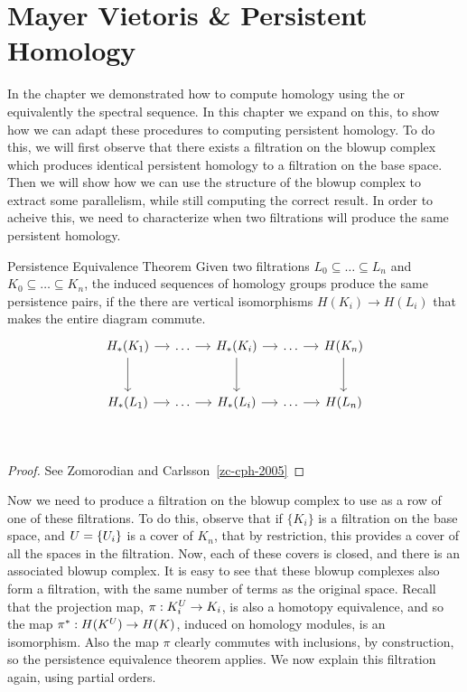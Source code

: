 \chapter{Mayer Vietoris \& Persistent Homology}
In the chapter we demonstrated how to compute homology using the \mvb{} or equivalently the \mv spectral sequence. In this chapter we expand on this, to show how we can adapt these procedures to computing persistent homology. To do this, we will first observe that there exists a filtration on the blowup complex which produces identical persistent homology to a filtration on the base space. Then we will show how we can use the structure of the blowup complex to extract some parallelism, while still computing the correct result. In order to acheive this, we need to characterize when two filtrations will produce the same persistent homology. 
\begin{theorem}{Persistence Equivalence Theorem}
    Given two filtrations $L_0 \subseteq \ldots \subseteq L_n$ and
    $K_0 \subseteq \ldots \subseteq K_n$, the induced sequences of homology
    groups produce the same persistence pairs,
    if the there are vertical isomorphisms $H(K_i) \to H(L_i)$ that makes the entire diagram commute.
\[
\begin{tikzcd}[row sep=large, column sep=small]
    H_*(K_1) \arrow{r}\arrow{d} & \ldots \arrow{r} & H_*(K_i)  \arrow{r}\arrow{d} & \ldots \arrow{r} & H(K_n) \arrow{d} \\
    H_*(L_1) \arrow{r} & \ldots \arrow{r} & H_*(L_i)  \arrow{r} & \ldots \arrow{r} & H(L_n) \\
\end{tikzcd}
\]
\end{theorem}
\begin{proof}
See Zomorodian and Carlsson~\ref{zc-cph-2005}
\end{proof}
Now we need to produce a filtration on the blowup complex to use as a row of one of these filtrations. To do this, observe that if $\{K_i\}$ is a filtration on the base space, and $U =\{ U_i \}$ is a cover of $K_n$, that by restriction, this provides a cover of all the spaces in the filtration. Now, each of these covers is closed, and there is an associated blowup complex. It is easy to see that these blowup complexes also form a filtration, with the same number of terms as the original space. Recall that the projection map, $\pi: K_i^U \to K_i$, is also a homotopy equivalence, and so the map $\pi^*: H(K^U) \to H(K)$, induced on homology modules, is an isomorphism. Also the map $\pi$ clearly commutes with inclusions, by construction, so  the persistence equivalence theorem applies. We now explain this filtration again, using partial orders.

